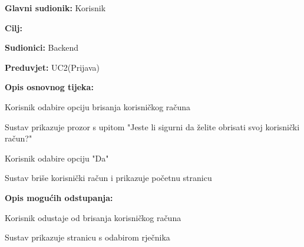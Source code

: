 					\noindent {}
					\begin{packed_item}
						
						\item \textbf{Glavni sudionik: } Korisnik
						\item  \textbf{Cilj:} 
						\item  \textbf{Sudionici:} Backend
						\item  \textbf{Preduvjet:} UC2(Prijava)
						\item  \textbf{Opis osnovnog tijeka:}
						
						\item[] \begin{packed_enum}
							
							\item Korisnik odabire opciju brisanja korisničkog računa
							\item Sustav prikazuje prozor s upitom "Jeste li sigurni da želite obrisati svoj korisnički račun?"
							\item Korisnik odabire opciju "Da"
							\item Sustav briše korisnički račun i prikazuje početnu stranicu
						\end{packed_enum}
						
						\item  \textbf{Opis mogućih odstupanja:}
						
						\item[] \begin{packed_item}
							
							\item[3.a] Korisnik odustaje od brisanja korisničkog računa
							\item[] \begin{packed_enum}
								
								\item Sustav prikazuje stranicu s odabirom rječnika
								
							\end{packed_enum}
							
						\end{packed_item}
					\end{packed_item}
					
